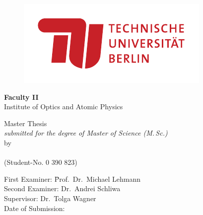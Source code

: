 \begin{titlepage}
	\begin{figure}[H]
	\centering
	\includegraphics[scale=2]{Figures/Logo.pdf}
	\end{figure}
	{\center
	{\LARGE
	\textbf{Faculty II}\\
	Institute of Optics and Atomic Physics}\\
	\vspace*{\fill}

	\hrulefill

	{\Huge \textbf{\thesistitle}\par}

	\hrulefill

	\vspace*{\fill}
	{\LARGE Master Thesis}\\
	\emph{submitted for the degree of Master of Science (M.\,Sc.)}\\
	\vspace*{\fill}
	by\\
	{\Large \textbf{\thesisauthor}}\\
	(Student-No. 0 390 823)\\
	}
	\vspace*{10mm}
	\begin{tabbing}
	\hspace*{4cm}First Examiner: \hspace*{1cm}\=Prof.~Dr.~Michael Lehmann\\
	\hspace*{4cm}Second Examiner: \>Dr.~Andrei Schliwa\\
	\hspace*{4cm}Supervisor: \>Dr.~Tolga Wagner\\
	\hspace*{4cm}Date of Submission: \>\submissiondate \\
	\end{tabbing}
\end{titlepage}
